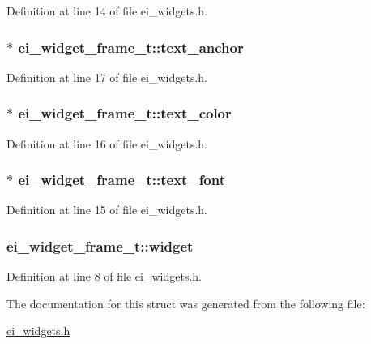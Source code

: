 Definition at line 14 of file ei\-\_\-widgets.\-h.

\hypertarget{structei__widget__frame__t_af56c6236bb9f5451fbfcaf12ae9c10bd}{
\subsubsection[{text\-\_\-anchor}]{$\ast$ ei\-\_\-widget\-\_\-frame\-\_\-t\-::text\-\_\-anchor}}\label{structei__widget__frame__t_af56c6236bb9f5451fbfcaf12ae9c10bd}


Definition at line 17 of file ei\-\_\-widgets.\-h.

\hypertarget{structei__widget__frame__t_afcbf12b8f0763cf402873b246b94296d}{
\subsubsection[{text\-\_\-color}]{$\ast$ ei\-\_\-widget\-\_\-frame\-\_\-t\-::text\-\_\-color}}\label{structei__widget__frame__t_afcbf12b8f0763cf402873b246b94296d}


Definition at line 16 of file ei\-\_\-widgets.\-h.

\hypertarget{structei__widget__frame__t_a63f5b7da07b35a391b4e5280a1b2c982}{
\subsubsection[{text\-\_\-font}]{$\ast$ ei\-\_\-widget\-\_\-frame\-\_\-t\-::text\-\_\-font}}\label{structei__widget__frame__t_a63f5b7da07b35a391b4e5280a1b2c982}


Definition at line 15 of file ei\-\_\-widgets.\-h.

\hypertarget{structei__widget__frame__t_ad375e0d41821e8f1dcf5e061d140ac0d}{
\subsubsection[{widget}]{ ei\-\_\-widget\-\_\-frame\-\_\-t\-::widget}}\label{structei__widget__frame__t_ad375e0d41821e8f1dcf5e061d140ac0d}


Definition at line 8 of file ei\-\_\-widgets.\-h.



The documentation for this struct was generated from the following file\-:\begin{DoxyCompactItemize}
\item 
\hyperlink{ei__widgets_8h}{ei\-\_\-widgets.\-h}\end{DoxyCompactItemize}
